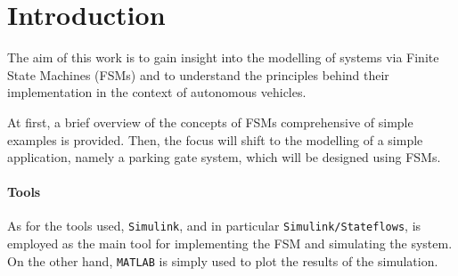 \section{Introduction}
\label{sec:introduction}

The aim of this work is to gain insight into the modelling of systems via Finite State Machines (FSMs) and to understand the principles behind their implementation in the context of autonomous vehicles.

At first, a brief overview of the concepts of FSMs comprehensive of simple examples is provided.
Then, the focus will shift to the modelling of a simple application, namely a parking gate system, which will be designed using FSMs.

\paragraph{Tools}

As for the tools used, \texttt{Simulink}, and in particular \texttt{Simulink/Stateflows}, is employed as the main tool for implementing the FSM and simulating the system.
On the other hand, \texttt{MATLAB} is simply used to plot the results of the simulation.